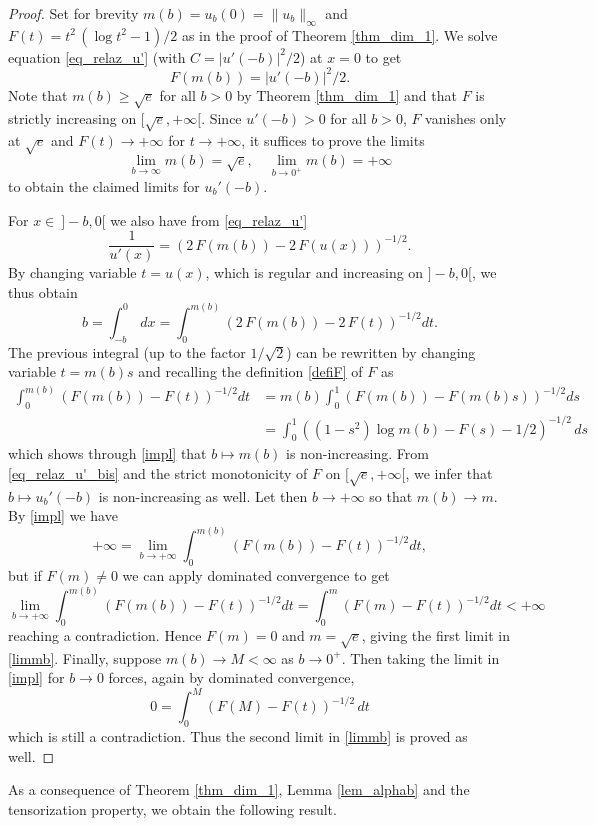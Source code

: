 \documentclass[12pt]{amsart}
\numberwithin{equation}{section}
\theoremstyle{plain}
\theoremstyle{plain}
\theoremstyle{plain}
\theoremstyle{definition}
\newcommand{\beq}{\begin{equation}}
\newcommand{\eeq}{\end{equation}}
\renewcommand{\ge}{\geqslant}
\begin{document}
\begin{proof}
 Set for brevity $m(b)=u_b(0)=\|u_b\|_\infty$ and $F(t)=t^2\, (\log t^2-1)/2$ as in the proof of Theorem \ref{thm_dim_1}.
We solve equation \eqref{eq_relaz_u'} (with $C=|u'(-b)|^2/2$) at $x=0$ to get
\beq
\label{eq_relaz_u'_bis}
F(m(b))=|u'(-b)|^2/2.
\eeq
Note that $m(b)\ge \sqrt{e}$ for all $b>0$ by Theorem \ref{thm_dim_1} and that $F$ is strictly increasing on $[\sqrt{e}, +\infty[$. 
Since $u'(-b)>0$ for all $b>0$, $F$ vanishes only at $\sqrt{e}$ and $F(t)\to +\infty$ for $t\to +\infty$, it suffices to prove the limits 
\beq
\label{limmb}
\lim_{b\to \infty} m(b)= \sqrt{e}, \quad \lim_{b\to 0^{+}} m(b)=+\infty
\eeq
to obtain the claimed limits for $u_b'(-b)$.

For $x\in \ ]-b, 0[$ we also have from \eqref{eq_relaz_u'}
\[
\frac{1}{u'(x)}=\left(2\, F(m(b))-2\, F(u(x))\right)^{-1/2}.
\]
By changing variable $t=u(x)$, which is regular and increasing on $]-b, 0[$, we thus obtain
\beq
\label{impl}
b=\int_{-b}^0\, dx=\int_{0}^{m(b)}\left(2\, F(m(b))-2\, F(t)\right)^{-1/2} dt.
\eeq
The previous integral (up to the factor $1/\sqrt{2}$) can be rewritten by changing variable $t=m(b) s$ and recalling the definition \eqref{defiF} of $F$ as
\[
\begin{split}
\int_{0}^{m(b)}\left(F(m(b))-F(t)\right)^{-1/2} dt&=m(b)\int_0^1\left(F(m(b))-F(m(b) s)\right)^{-1/2} ds\\
&=\int_0^1\left((1-s^2)\log m(b)-F(s)-1/2\right)^{-1/2}\, ds
\end{split}
\]
which shows through \eqref{impl} that $b\mapsto m(b)$ is non-increasing. 
From \eqref{eq_relaz_u'_bis} and the strict monotonicity of $F$ on $[\sqrt{e}, +\infty[$, we infer that $b\mapsto u_b'(-b)$ is non-increasing as well.
Let then $b\to +\infty$ so that $m(b)\to m$. 
By \eqref{impl} we have
\[
+\infty=\lim_{b\to +\infty} \int_{0}^{m(b)}\left(F(m(b))-F(t)\right)^{-1/2} dt,
\]
but if $F(m)\ne 0$ we can apply dominated convergence to get
\[
\lim_{b\to +\infty}\int_0^{m(b)}\left(F(m(b))-F(t)\right)^{-1/2} dt= \int_0^{m}\left(F(m)-F(t)\right)^{-1/2} dt<+\infty
\]
reaching a contradiction. Hence $F(m)=0$ and $m=\sqrt{e}$, giving the first limit in \eqref{limmb}. Finally, suppose $m(b)\to M<\infty$ as $b\to 0^+$. Then taking the limit in \eqref{impl} for $b\to 0$ forces, again by dominated convergence,
\[
0=\int_0^M(F(M)-F(t))^{-1/2}\, dt
\]
which is still a contradiction. Thus the second limit in \eqref{limmb} is proved as well.
\end{proof}

As a consequence of Theorem \ref{thm_dim_1}, Lemma \ref{lem_alphab} and the tensorization property, we obtain the following result.
\end{document}
